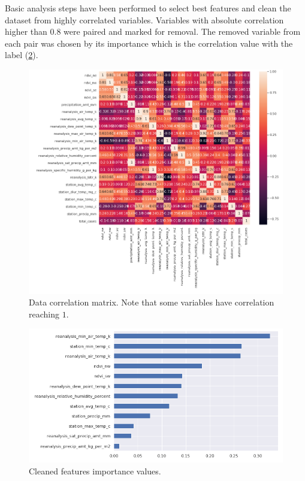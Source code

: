 \documentclass[sigconf]{acmart}
\begin{document}
Basic analysis steps have been performed to select best features and clean the dataset from highly correlated variables. Variables with absolute correlation higher than $0.8$ were paired and marked for removal. The removed variable from each pair was chosen by its importance which is the correlation value with the label (\ref{importance}).

\begin{figure}[h]
    \includegraphics[width=\linewidth]{corr.png}
    \centering
    \caption{Data correlation matrix. Note that some variables have correlation reaching $1$.}
    \label{corr}
\end{figure}
\begin{figure}[h]
    \includegraphics[width=\linewidth]{importance.png}
    \centering
    \caption{Cleaned features importance values.}
    \label{importance}
\end{figure}
\end{document}
